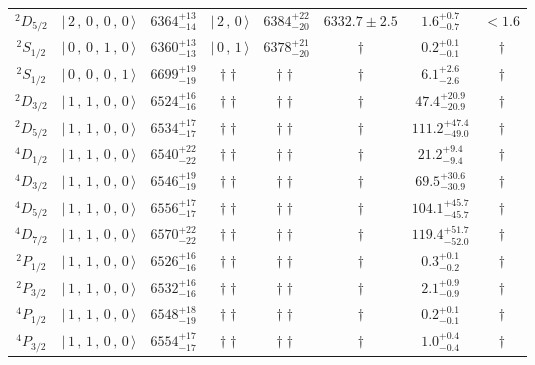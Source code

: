 \begin{tabular}{c| c c c c c c c}
$^{2}D_{5/2}$ & $\vert \,2\,,\,0\,,\,0\,,\,0 \,\rangle $ & $6364^{+13}_{-14}$ & $\vert \,2\,,\,0 \,\rangle$ & $6384^{+22}_{-20}$ & $6332.7\pm 2.5$ & $1.6^{+0.7}_{-0.7}$ & $<1.6$ \\ 
$^{2}S_{1/2}$ & $\vert \,0\,,\,0\,,\,1\,,\,0 \,\rangle $ & $6360^{+13}_{-13}$ & $\vert \,0\,,\,1 \,\rangle$ & $6378^{+21}_{-20}$ & $\dagger$ & $0.2^{+0.1}_{-0.1}$ & $\dagger$ \\ 
$^{2}S_{1/2}$ & $\vert \,0\,,\,0\,,\,0\,,\,1 \,\rangle $ & $6699^{+19}_{-19}$ & $\dagger\dagger$ & $\dagger\dagger$ & $\dagger$ & $6.1^{+2.6}_{-2.6}$ & $\dagger$ \\ 
$^{2}D_{3/2}$ & $\vert \,1\,,\,1\,,\,0\,,\,0 \,\rangle $ & $6524^{+16}_{-16}$ & $\dagger\dagger$ & $\dagger\dagger$ & $\dagger$ & $47.4^{+20.9}_{-20.9}$ & $\dagger$ \\ 
$^{2}D_{5/2}$ & $\vert \,1\,,\,1\,,\,0\,,\,0 \,\rangle $ & $6534^{+17}_{-17}$ & $\dagger\dagger$ & $\dagger\dagger$ & $\dagger$ & $111.2^{+47.4}_{-49.0}$ & $\dagger$ \\ 
$^{4}D_{1/2}$ & $\vert \,1\,,\,1\,,\,0\,,\,0 \,\rangle $ & $6540^{+22}_{-22}$ & $\dagger\dagger$ & $\dagger\dagger$ & $\dagger$ & $21.2^{+9.4}_{-9.4}$ & $\dagger$ \\ 
$^{4}D_{3/2}$ & $\vert \,1\,,\,1\,,\,0\,,\,0 \,\rangle $ & $6546^{+19}_{-19}$ & $\dagger\dagger$ & $\dagger\dagger$ & $\dagger$ & $69.5^{+30.6}_{-30.9}$ & $\dagger$ \\ 
$^{4}D_{5/2}$ & $\vert \,1\,,\,1\,,\,0\,,\,0 \,\rangle $ & $6556^{+17}_{-17}$ & $\dagger\dagger$ & $\dagger\dagger$ & $\dagger$ & $104.1^{+45.7}_{-45.7}$ & $\dagger$ \\ 
$^{4}D_{7/2}$ & $\vert \,1\,,\,1\,,\,0\,,\,0 \,\rangle $ & $6570^{+22}_{-22}$ & $\dagger\dagger$ & $\dagger\dagger$ & $\dagger$ & $119.4^{+51.7}_{-52.0}$ & $\dagger$ \\ 
$^{2}P_{1/2}$ & $\vert \,1\,,\,1\,,\,0\,,\,0 \,\rangle $ & $6526^{+16}_{-16}$ & $\dagger\dagger$ & $\dagger\dagger$ & $\dagger$ & $0.3^{+0.1}_{-0.2}$ & $\dagger$ \\ 
$^{2}P_{3/2}$ & $\vert \,1\,,\,1\,,\,0\,,\,0 \,\rangle $ & $6532^{+16}_{-16}$ & $\dagger\dagger$ & $\dagger\dagger$ & $\dagger$ & $2.1^{+0.9}_{-0.9}$ & $\dagger$ \\ 
$^{4}P_{1/2}$ & $\vert \,1\,,\,1\,,\,0\,,\,0 \,\rangle $ & $6548^{+18}_{-19}$ & $\dagger\dagger$ & $\dagger\dagger$ & $\dagger$ & $0.2^{+0.1}_{-0.1}$ & $\dagger$ \\ 
$^{4}P_{3/2}$ & $\vert \,1\,,\,1\,,\,0\,,\,0 \,\rangle $ & $6554^{+17}_{-17}$ & $\dagger\dagger$ & $\dagger\dagger$ & $\dagger$ & $1.0^{+0.4}_{-0.4}$ & $\dagger$ \\ 

\end{tabular}
